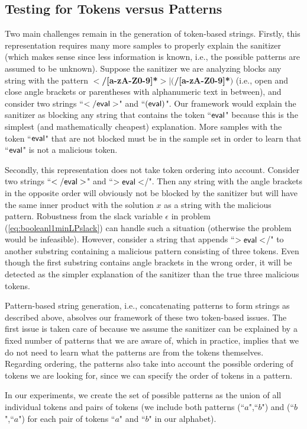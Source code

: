 \subsection{Testing for Tokens versus Patterns}
Two main challenges remain in the generation of token-based strings. Firstly, this representation requires many more samples to properly explain the sanitizer (which makes sense since less information is known, i.e., the possible patterns are assumed to be unknown). Suppose the sanitizer we are analyzing blocks any string with the pattern \textbf{$<$/[a-zA-Z0-9]*$>$$|$$($/[a-zA-Z0-9]*$)$} (i.e., open and close angle brackets or parentheses with alphanumeric text in between), and consider two strings ``$\sf{</eval>}$" and ``$\sf{(eval)}$". Our framework would explain the sanitizer as blocking any string that contains the token ``$\sf{eval}$" because this is the simplest (and mathematically cheapest) explanation. More samples with the token ``$\sf{eval}$" that are not blocked must be in the sample set in order to learn that ``$\sf{eval}$" is not a malicious token.

Secondly, this representation does not take token ordering into account. Consider two strings ``$\sf{</eval>}$" and ``$\sf{>eval<}$/". Then any string with the angle brackets in the opposite order will obviously not be blocked by the sanitizer but will have the same inner product with the solution $x$ as a string with the malicious pattern. Robustness from the slack variable $\epsilon$ in problem (\ref{eq:booleanl1minLPslack}) can handle such a situation (otherwise the problem would be infeasible). However, consider a string that appends ``$\sf{>eval<}$/" to another substring containing a malicious pattern consisting of three tokens.  Even though the  first substring contains angle brackets in the wrong order, it will be detected as the simpler explanation of the sanitizer than the true three malicious tokens.

Pattern-based string generation, i.e., concatenating patterns to form strings as described above, absolves our framework of these two token-based issues. The first issue is taken care of because we assume the sanitizer can be explained by a fixed number of patterns that we are aware of, which in practice, implies that we do not need to learn what the patterns are from the tokens themselves. Regarding ordering, the patterns also take into account the possible ordering of tokens we are looking for, since we can specify the order of tokens in a pattern.

In our experiments, we create the set of possible patterns as the union of all individual tokens and pairs of tokens (we include both patterns (``$a$",``$b$") and (``$b$",``$a$") for each pair of tokens ``$a$" and ``$b$" in our alphabet).

